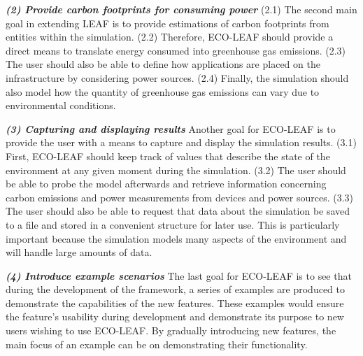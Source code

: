 \documentclass{l4proj}
\begin{document}
\textbf{\textit{(2) Provide carbon footprints for consuming power}}
(2.1)\label{goal2.1} The second main goal in extending LEAF is to provide estimations of carbon footprints from entities within the simulation.
(2.2)\label{goal2.2} Therefore, ECO-LEAF should provide a direct means to translate energy consumed into greenhouse gas emissions.
(2.3)\label{goal2.3} The user should also be able to define how applications are placed on the infrastructure by considering power sources.
(2.4)\label{goal2.4} Finally, the simulation should also model how the quantity of greenhouse gas emissions can vary due to environmental conditions.

\textbf{\textit{(3) Capturing and displaying results}}
Another goal for ECO-LEAF is to provide the user with a means to capture and display the simulation results.
(3.1)\label{goal3.1} First, ECO-LEAF should keep track of values that describe the state of the environment at any given moment during the simulation.
(3.2)\label{goal3.2} The user should be able to probe the model afterwards and retrieve information concerning carbon emissions and power measurements from devices and power sources.
(3.3)\label{goal3.3} The user should also be able to request that data about the simulation be saved to a file and stored in a convenient structure for later use.
This is particularly important because the simulation models many aspects of the environment and will handle large amounts of data.

\textbf{\textit{(4) Introduce example scenarios}}
The last goal for ECO-LEAF is to see that during the development of the framework, a series of examples are produced to demonstrate the capabilities of the new features.
These examples would ensure the feature's usability during development and demonstrate its purpose to new users wishing to use ECO-LEAF.
By gradually introducing new features, the main focus of an example can be on demonstrating their functionality.
\end{document}

